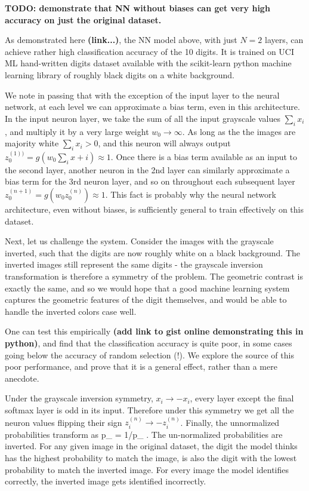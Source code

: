 \documentclass[twocolumn, prl]{revtex4-1}
\begin{document}
{\bf TODO: demonstrate that NN without biases can get very high accuracy on just the original dataset.}

As demonstrated here {\bf (link...)}, the NN model above, with just $N=2$ layers, can achieve rather high classification accuracy of the 10 digits.
It is trained on UCI ML hand-written digits dataset available with the scikit-learn python machine learning library\cite{} of roughly black digits on a white background.

We note in passing that with the exception of the input layer to the neural network, at each level we can approximate a bias term, even in this architecture. In the input neuron layer, we take the sum of all the input grayscale values $\sum_i x_i$, and multiply it by a very large weight $w_0 \rightarrow \infty$. As long as the the images are majority white $\sum_i x_i > 0$, and this neuron will always output $z_0^{(1))} = g\left( w_0 \sum_i x+i \right)\approx 1$. Once there is a bias term available as an input to the second layer, another neuron in the 2nd layer can similarly approximate a bias term for the 3rd neuron layer, and so on throughout each subsequent layer $z_0^{(n+1)} = g\left( w_0 z_0^{(n)} \right)\approx 1$. This fact is probably why the neural network architecture, even without biases, is sufficiently general to train effectively on this dataset.

Next, let us challenge the system. Consider the images with the grayscale inverted, such that the digits are now roughly white on 
a black background. The inverted images still represent the same digits - the grayscale inversion transformation is therefore a symmetry of the problem. The geometric contrast is exactly the same, and so we would hope that a good machine learning system captures the geometric features of the digit themselves, and would be able to handle the inverted colors case well.

One can test this empirically {\bf (add link to gist online demonstrating this in python)}, and find that the classification accuracy is quite poor, in some cases going below the accuracy of random selection (!). We explore the source of this poor performance, and prove that it is a general effect, rather than a mere anecdote.

Under the grayscale inversion symmetry, $x_i \rightarrow - x_i$, every layer except the final softmax layer is odd in its 
input. Therefore under this symmetry we get all the neuron values flipping their sign $z^{(n)}_i \rightarrow - z^{(n)}_i$. Finally, the unnormalized probabilities transform as
\be
{\tilde p}_{\alpha} \rightarrow \exp{} = 1/{\tilde p}_{\alpha}
\; .
\ee
The un-normalized probabilities are inverted. For any given image in the original dataset, the digit the model thinks has the highest probability to match the image, is also the digit with the lowest probability to match the inverted image. For every image the model identifies correctly, the inverted image gets identified incorrectly.
\end{document}
